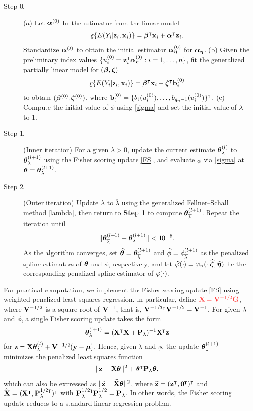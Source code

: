 \begin{description}
	\item[Step 0.]  
	(a) Let $\bm\alpha^{(0)}$ be the estimator from the linear model  
	\[
	\textsl{g}\{E(Y_i|\mathbf{z}_i,\mathbf{x}_i)\} = \bm\beta^\intercal\mathbf{x}_i + \bm\alpha^\intercal\mathbf{z}_i.
	\]
	Standardize $\bm\alpha^{(0)}$ to obtain the initial estimator $\bm\alpha_{\bm\eta}^{(0)}$ for $\bm\alpha_{\bm\eta}$.  
	(b) Given the preliminary index values $\{u_i^{(0)} = \mathbf{z}_i^\intercal\bm\alpha_{\bm\eta}^{(0)}: i = 1,\ldots,n\}$, fit the generalized partially linear model for $(\bm\beta,\bm\zeta)$  
	$$
	\textsl{g}\{E(Y_i|\mathbf{z}_i,\mathbf{x}_i)\} = \bm\beta^\intercal\mathbf{x}_i + \bm\zeta^\intercal\mathbf{b}_i^{(0)}
	$$
	to obtain $(\bm\beta^{(0)},\bm\zeta^{(0)})$, where $\mathbf{b}_i^{(0)} = \{b_1(u_i^{(0)}),\ldots,b_{q_n-1}(u_i^{(0)})\}^\intercal$.  
	(c) Compute the initial value of $\phi$ using \eqref{sigma} and set the initial value of $\lambda$ to 1.
	
	\item[Step 1.] (Inner iteration)  
	For a given $\lambda>0$, update the current estimate $\bm\theta^{(l)}_\lambda$ to $\bm\theta^{(l+1)}_\lambda$ using the Fisher scoring update \eqref{FS}, and evaluate $\phi$ via \eqref{sigma} at $\bm\theta = \bm\theta^{(l+1)}_\lambda$.
	
	\item[Step 2.] (Outer iteration)  
	Update $\lambda$ to $\overline\lambda$ using the generalized Fellner--Schall method \eqref{lambda}, then return to \textbf{Step 1} to compute $\bm\theta_{\overline\lambda}^{(l+1)}$.  
	Repeat the iteration until  
	$$
	\|\bm\theta_{\overline\lambda}^{(l+1)} - \bm\theta_\lambda^{(l+1)}\| < 10^{-6}.
	$$
	As the algorithm converges, set $\widehat{\bm\theta} = \bm\theta_{\overline\lambda}^{(l+1)}$ and $\widehat\phi = \phi_{\overline\lambda}^{(l+1)}$ as the penalized spline estimators of $\bm\theta$ and $\phi$, respectively, and let $\widehat{\varphi}(\cdot) = \varphi_n(\cdot|\widehat{\bm\zeta},\widehat{\bm\eta})$ be the corresponding penalized spline estimator of $\varphi(\cdot)$.	
\end{description}
For practical computation, we implement the Fisher scoring update \eqref{FS} using weighted penalized least squares regression. In particular, define $\x\BX = \BV^{-1/2}\BG$, 
where $\mathbf{V}^{-1/2}$ is a square root of $\mathbf{V}^{-1}$, that is, $\mathbf{V}^{-1/2\intercal}\mathbf{V}^{-1/2} = \mathbf{V}^{-1}$. For given $\lambda$ and $\phi$, a single Fisher scoring update takes the form
\begin{align*}
	\bm\theta^{(l+1)}_\lambda = (\mathbf{X}^\intercal\mathbf{X} + \mathbf{P}_\lambda)^{-1}\mathbf{X}^\intercal\mathbf{z}
\end{align*}
for $\mathbf{z} = \mathbf{X}\bm\theta^{(l)}_\lambda + \mathbf{V}^{-1/2}(\mathbf{y} - \bm\mu)$. Hence, given $\lambda$ and $\phi$, the update $\bm\theta^{(l+1)}_\lambda$ minimizes the penalized least squares function
\begin{equation}\label{pwls3}
	\|\mathbf{z} - \mathbf{X}\bm\theta\|^2 + \bm\theta^\intercal\mathbf{P}_\lambda\bm\theta,
\end{equation}
which can also be expressed as $\|\widetilde{\mathbf{z}} - \widetilde{\mathbf{X}}\bm\theta\|^2$, where $\widetilde{\mathbf{z}} = (\mathbf{z}^\intercal,\mathbf{0}^\intercal)^\intercal$ and $\widetilde{\mathbf{X}} = (\mathbf{X}^\intercal,\mathbf{P}_\lambda^{1/2\intercal})^\intercal$ with $\mathbf{P}_\lambda^{1/2\intercal}\mathbf{P}_\lambda^{1/2} = \mathbf{P}_\lambda$. In other words, the Fisher scoring update reduces to a standard linear regression problem. 

